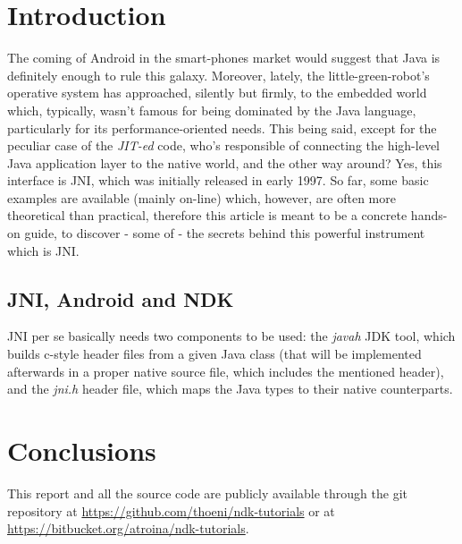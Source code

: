 \documentclass[a4paper,10pt]{article}
\begin{document}
\vspace{6ex}	%
\begin{multicols}{2}

\section{Introduction}
The coming of Android in the smart-phones market would suggest that Java is
definitely enough to rule this galaxy. Moreover, lately, the little-green-robot's
operative system has approached, silently but firmly, to the embedded world
which, typically, wasn't famous for being dominated by the Java language, 
particularly for its performance-oriented needs. This being said, except for
the peculiar case of the \textit{JIT-ed} code, who's responsible of connecting
the high-level Java application layer to the native world, and the other way
around? Yes, this interface is JNI, which was initially released in early 1997.
So far, some basic examples are available (mainly on-line) which, however, are
often more theoretical than practical, therefore this article is meant to be a
concrete hands-on guide, to discover - some of - the secrets behind this powerful instrument which is JNI.

\subsection{JNI, Android and NDK}
\label{sec:jni-android-ndk}
JNI per se basically needs two components to be used: the \textit{javah} JDK
tool, which builds c-style header files from a given Java class (that will be
implemented afterwards in a proper native source file, which includes the
mentioned header), and the \textit{jni.h} header file, which maps the Java types
to their native counterparts.


\section{Conclusions}

This report and all the source code are publicly available through the git
repository at \url{https://github.com/thoeni/ndk-tutorials} or at \url{https://bitbucket.org/atroina/ndk-tutorials}.

\nocite{liang1999jni}
\nocite{marakanajni}




\end{multicols}
\end{document}
